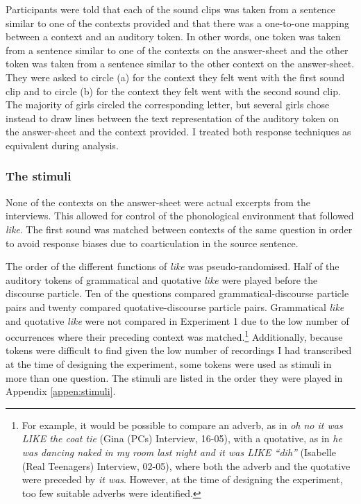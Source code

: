 Participants were told that each of the sound clips was taken from a sentence similar to one of the contexts provided and that there was a one-to-one mapping between a context and an auditory token.  In other words, one token was taken from a sentence similar to one of the contexts on the answer-sheet and the other token was taken from a sentence similar to the other context on the answer-sheet.  They were asked to circle (a) for the context they felt went with the first sound clip and to circle (b) for the context they felt went with the second sound clip.  The majority of girls circled the corresponding letter, but several girls chose instead to draw lines between the text representation of the auditory token on the answer-sheet and the context provided.  I treated both response techniques as equivalent during analysis.

\subsubsection{The stimuli}

None of the contexts on the answer-sheet were actual excerpts from the interviews.  This allowed for control of the phonological environment that followed \textit{like}.  The first sound was matched between contexts of the same question in order to avoid response biases due to coarticulation in the source sentence.

The order of the different functions of \textit{like} was pseudo-randomised.  Half of the auditory tokens of grammatical and quotative \textit{like} were played before the discourse particle.  Ten of the questions compared grammatical-discourse particle pairs and twenty compared quotative-discourse particle pairs.  Grammatical \textit{like} and quotative \textit{like} were not compared in Experiment 1 due to the low number of occurrences where their preceding context was matched.\footnote{For example, it would be possible to compare an adverb, as in \textit{oh no it was LIKE the coat tie} (Gina (PCs) Interview, 16-05), with a quotative, as in \textit{he was dancing naked in my room last night and it was LIKE ``dih''} (Isabelle (Real Teenagers) Interview, 02-05), where both the adverb and the quotative were preceded by \textit{it was}.  However, at the time of designing the experiment, too few suitable adverbs were identified.}  Additionally, because tokens were difficult to find given the low number of recordings I had transcribed at the time of designing the experiment, some tokens were used as stimuli in more than one question.  The stimuli are listed in the order they were played in Appendix \ref{appen:stimuli}.

